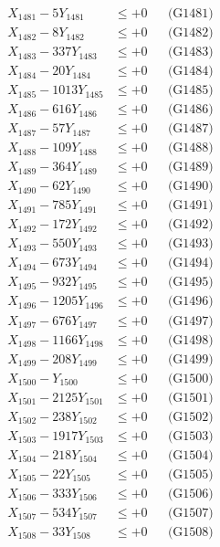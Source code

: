 \documentclass[a4paper,10pt]{article}
\begin{document}
{\begin{align}
\allowbreak
X_{1481} - 5Y_{1481} &\leq +0 && \text{(G1481)} \\
X_{1482} - 8Y_{1482} &\leq +0 && \text{(G1482)} \\
X_{1483} - 337Y_{1483} &\leq +0 && \text{(G1483)} \\
X_{1484} - 20Y_{1484} &\leq +0 && \text{(G1484)} \\
X_{1485} - 1013Y_{1485} &\leq +0 && \text{(G1485)} \\
X_{1486} - 616Y_{1486} &\leq +0 && \text{(G1486)} \\
X_{1487} - 57Y_{1487} &\leq +0 && \text{(G1487)} \\
X_{1488} - 109Y_{1488} &\leq +0 && \text{(G1488)} \\
X_{1489} - 364Y_{1489} &\leq +0 && \text{(G1489)} \\
X_{1490} - 62Y_{1490} &\leq +0 && \text{(G1490)} \\
\allowbreak
X_{1491} - 785Y_{1491} &\leq +0 && \text{(G1491)} \\
X_{1492} - 172Y_{1492} &\leq +0 && \text{(G1492)} \\
X_{1493} - 550Y_{1493} &\leq +0 && \text{(G1493)} \\
X_{1494} - 673Y_{1494} &\leq +0 && \text{(G1494)} \\
X_{1495} - 932Y_{1495} &\leq +0 && \text{(G1495)} \\
X_{1496} - 1205Y_{1496} &\leq +0 && \text{(G1496)} \\
X_{1497} - 676Y_{1497} &\leq +0 && \text{(G1497)} \\
X_{1498} - 1166Y_{1498} &\leq +0 && \text{(G1498)} \\
X_{1499} - 208Y_{1499} &\leq +0 && \text{(G1499)} \\
X_{1500} - Y_{1500} &\leq +0 && \text{(G1500)} \\
\allowbreak
X_{1501} - 2125Y_{1501} &\leq +0 && \text{(G1501)} \\
X_{1502} - 238Y_{1502} &\leq +0 && \text{(G1502)} \\
X_{1503} - 1917Y_{1503} &\leq +0 && \text{(G1503)} \\
X_{1504} - 218Y_{1504} &\leq +0 && \text{(G1504)} \\
X_{1505} - 22Y_{1505} &\leq +0 && \text{(G1505)} \\
X_{1506} - 333Y_{1506} &\leq +0 && \text{(G1506)} \\
X_{1507} - 534Y_{1507} &\leq +0 && \text{(G1507)} \\
X_{1508} - 33Y_{1508} &\leq +0 && \text{(G1508)} \\

\end{align}}
\end{document}
